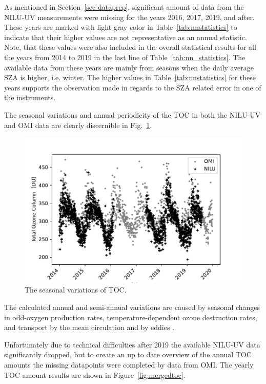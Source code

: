 \documentclass{optica-article}
\begin{document}

As mentioned in Section~\ref{sec-dataprep}, significant amount of data from the NILU-UV measurements were missing for the years 2016, 2017, 2019, and after. 
These years are marked with light gray color in Table~\ref{tab:nnstatistics} to indicate that their higher values are not representative as an annual statistic.
Note, that these values were also included in the overall statistical results for all the years from 2014 to 2019 in the last line of Table~\ref{tab:nn_statistics}. 
The available data from these years are mainly from seasons when the daily average SZA is higher, i.e. winter. 
The higher values in Table~\ref{tab:nnstatistics} for these years supports the observation made in regards to the SZA related error in one of the instruments.

The seasonal variations and annual periodicity of the TOC in both the NILU-UV and OMI data are clearly discernible in Fig.~\ref{fig:omil3niluo3allyear}.


\begin{figure}[H]
	\centering
	\includegraphics[width=0.75\linewidth]{OMI_L3_NILU_O3__all_year}
	\caption{The seasonal variations of TOC.}
	\label{fig:omil3niluo3allyear}
\end{figure}


The calculated annual and semi-annual variations are caused by seasonal changes in odd-oxygen production rates, temperature-dependent ozone destruction rates, and transport by the mean circulation and by eddies \cite{Perliski:1989}.

Unfortunately due to technical difficulties after 2019 the available NILU-UV data significantly dropped, but to create an up to date overview of the annual TOC amounts the missing datapoints were completed by data from OMI. The yearly TOC amount results are shown in Figure~\ref{fig:mergedtoc}.
\end{document}
